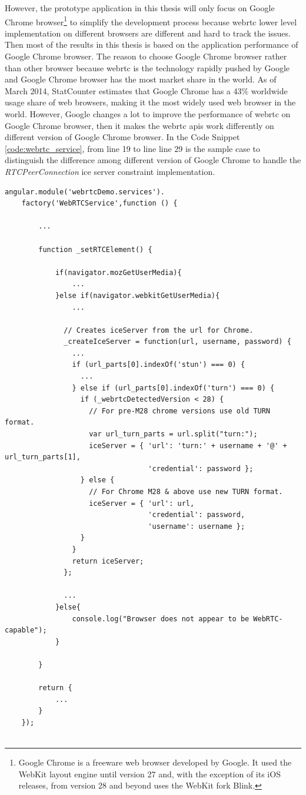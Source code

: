 \par However, the prototype application in this thesis will only focus on Google Chrome browser\footnote{Google Chrome is a freeware web browser developed by Google. It used the WebKit layout engine until version 27 and, with the exception of its iOS releases, from version 28 and beyond uses the WebKit fork Blink.\cite{wiki:google_chrome}} to simplify the development process because \gls{webrtc} lower level implementation on different browsers are different and hard to track the issues. Then most of the results in this thesis is based on the application performance of Google Chrome browser. The reason to choose Google Chrome browser rather than other browser because \gls{webrtc} is the technology rapidly pushed by Google and Google Chrome browser has the most market share in the world. As of March 2014, StatCounter estimates that Google Chrome has a 43\% worldwide usage share of web browsers, making it the most widely used web browser in the world.\cite{wiki:google_chrome} However, Google changes a lot to improve the performance of \gls{webrtc} on Google Chrome browser, then it makes the \gls{webrtc} \gls{api}s work differently on different version of Google Chrome browser. In the Code Snippet \ref{code:webrtc_service}, from line 19 to line line 29 is the sample case to distinguish the difference among different version of Google Chrome to handle the \textit{RTCPeerConnection} \gls{ice} server constraint implementation.

\begin{lstlisting}[caption={WebRTCService.js in application client},label={code:webrtc_service}]
angular.module('webrtcDemo.services').
	factory('WebRTCService',function () {
		
		...

		function _setRTCElement() {

			if(navigator.mozGetUserMedia){
				...
			}else if(navigator.webkitGetUserMedia){
				...

			  // Creates iceServer from the url for Chrome.
			  _createIceServer = function(url, username, password) {
			    ...
			    if (url_parts[0].indexOf('stun') === 0) {
			      ...
			    } else if (url_parts[0].indexOf('turn') === 0) {
			      if (_webrtcDetectedVersion < 28) {
			        // For pre-M28 chrome versions use old TURN format.
			        var url_turn_parts = url.split("turn:");
			        iceServer = { 'url': 'turn:' + username + '@' + url_turn_parts[1],
			                      'credential': password };
			      } else {
			        // For Chrome M28 & above use new TURN format.
			        iceServer = { 'url': url,
			                      'credential': password,
			                      'username': username };
			      }
			    }
			    return iceServer;
			  };

			  ...
			}else{
				console.log("Browser does not appear to be WebRTC-capable");
			}

		}

		return {
			...
		}
	});	
	
\end{lstlisting}

